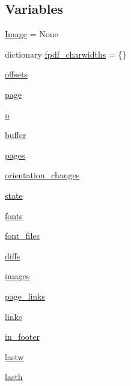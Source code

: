\subsection*{Variables}
\begin{DoxyCompactItemize}
\item 
\hyperlink{namespacemmasgis_1_1fpdf_a5ee24e6a531cb4381cd701942d174697}{Image} = None
\item 
dictionary \hyperlink{namespacemmasgis_1_1fpdf_a3a38b020c9a03349b8de3ba268e22b71}{fpdf\_\-charwidths} = \{\}
\item 
\hyperlink{namespacemmasgis_1_1fpdf_aaf552120496ea2f7d9f8c2c00eaffa9e}{offsets}
\item 
\hyperlink{namespacemmasgis_1_1fpdf_abace261635f8bff25d684edbb51ba2ed}{page}
\item 
\hyperlink{namespacemmasgis_1_1fpdf_a9f652e32be9d0ffdd3e4dc94a511f620}{n}
\item 
\hyperlink{namespacemmasgis_1_1fpdf_a1712e590aabdd81ffb7e5a0d0e0d2cb4}{buffer}
\item 
\hyperlink{namespacemmasgis_1_1fpdf_a92e234f2b774a049cd0598a10de84db2}{pages}
\item 
\hyperlink{namespacemmasgis_1_1fpdf_a67a0ff7115b90e1618972567c5598d36}{orientation\_\-changes}
\item 
\hyperlink{namespacemmasgis_1_1fpdf_a9d3cf3d017502df0e86d0d008fe753ae}{state}
\item 
\hyperlink{namespacemmasgis_1_1fpdf_a235b58539cfe05f958a331aac07845e6}{fonts}
\item 
\hyperlink{namespacemmasgis_1_1fpdf_a1fc4898d98da8f58b93b647064ef7976}{font\_\-files}
\item 
\hyperlink{namespacemmasgis_1_1fpdf_a7aba8bec0da8697381d33ff9d300146b}{diffs}
\item 
\hyperlink{namespacemmasgis_1_1fpdf_a33118a0c904fde34993341ee60b9cbe9}{images}
\item 
\hyperlink{namespacemmasgis_1_1fpdf_af9652ebbccae531725e58590a7366365}{page\_\-links}
\item 
\hyperlink{namespacemmasgis_1_1fpdf_a639967d160833420fe5dcd4e1a2c4bb8}{links}
\item 
\hyperlink{namespacemmasgis_1_1fpdf_a2192a94fe536bb3c57decbc9b54d2a33}{in\_\-footer}
\item 
\hyperlink{namespacemmasgis_1_1fpdf_a8a5ec9ad331d5c87c323bc530f8999c6}{lastw}
\item 
\hyperlink{namespacemmasgis_1_1fpdf_a379931dbed6d2927d298d5978f77dc84}{lasth}
\item 

\end{DoxyCompactItemize}
